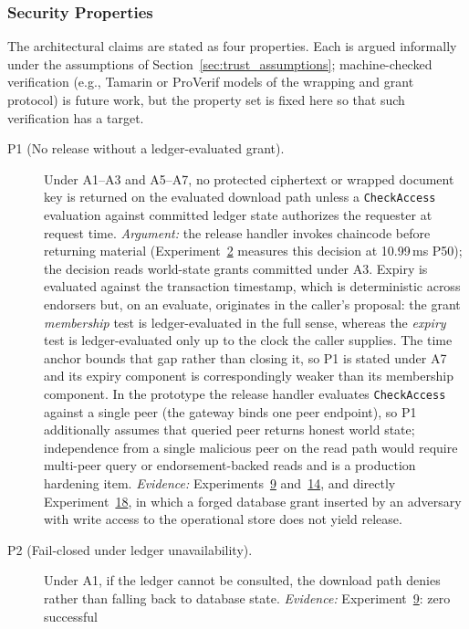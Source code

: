 \documentclass[preprint,12pt]{elsarticle}
\begin{document}
\subsubsection{Security Properties}
\label{sec:security_properties}

The architectural claims are stated as four properties. Each is argued
informally under the assumptions of
Section~\ref{sec:trust_assumptions}; machine-checked verification
(e.g., Tamarin or ProVerif models of the wrapping and grant protocol)
is future work, but the property set is fixed here so that such
verification has a target.

\begin{description}
\item[P1 (No release without a ledger-evaluated grant).] Under
A1--A3 and A5--A7, no protected ciphertext or wrapped document key is
returned on the evaluated download path unless a \texttt{CheckAccess}
evaluation against committed ledger state authorizes the requester at
request time. \emph{Argument:} the release handler invokes chaincode
before returning material (Experiment~\hyperref[sec:exp_latency]{2}
measures this decision at 10.99\,ms P50); the decision reads
world-state grants committed under A3. Expiry is evaluated against the
transaction timestamp, which is deterministic across endorsers but, on
an evaluate, originates in the caller's proposal: the grant
\emph{membership} test is ledger-evaluated in the full sense, whereas the
\emph{expiry} test is ledger-evaluated only up to the clock the caller
supplies. The time anchor bounds that gap rather than closing it, so P1
is stated under A7 and its expiry component is correspondingly weaker
than its membership component. In the prototype the release
handler evaluates \texttt{CheckAccess} against a single peer (the gateway
binds one peer endpoint), so P1 additionally assumes that queried peer
returns honest world state; independence from a single malicious peer on
the read path would require multi-peer query or endorsement-backed reads
and is a production hardening item. \emph{Evidence:}
Experiments~\hyperref[sec:exp_failclosed]{9}
and~\hyperref[sec:exp_baseline]{14}, and directly
Experiment~\hyperref[sec:exp_db_mutation]{18}, in which a forged
database grant inserted by an adversary with write access to the
operational store does not yield release.
\item[P2 (Fail-closed under ledger unavailability).] Under A1, if the
ledger cannot be consulted, the download path denies rather than
falling back to database state. \emph{Evidence:}
Experiment~\hyperref[sec:exp_failclosed]{9}: zero successful

\end{description}
\end{document}

